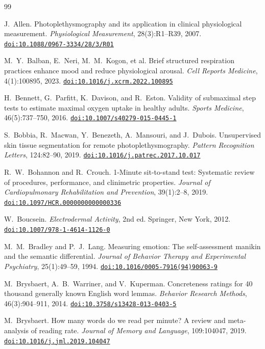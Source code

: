 \documentclass[11pt,a4paper]{article}
\newcommand{\doi}[1]{\href{https://doi.org/#1}{\nolinkurl{doi:#1}}}
\begin{document}
\begin{thebibliography}{99}
\small

 J.~Allen. Photoplethysmography and its application in clinical physiological measurement.
\emph{Physiological Measurement}, 28(3):R1--R39, 2007. \doi{10.1088/0967-3334/28/3/R01}

 M.~Y.~Balban, E.~Neri, M.~M.~Kogon, et al. Brief structured respiration practices enhance mood
and reduce physiological arousal. \emph{Cell Reports Medicine}, 4(1):100895, 2023. \doi{10.1016/j.xcrm.2022.100895}

 H.~Bennett, G.~Parfitt, K.~Davison, and R.~Eston. Validity of submaximal step tests to
estimate maximal oxygen uptake in healthy adults. \emph{Sports Medicine}, 46(5):737--750, 2016.
\doi{10.1007/s40279-015-0445-1}

 S.~Bobbia, R.~Macwan, Y.~Benezeth, A.~Mansouri, and J.~Dubois. Unsupervised skin tissue
segmentation for remote photoplethysmography. \emph{Pattern Recognition Letters}, 124:82--90, 2019.
\doi{10.1016/j.patrec.2017.10.017}

 R.~W.~Bohannon and R.~Crouch. 1-Minute sit-to-stand test: Systematic review of procedures,
performance, and clinimetric properties. \emph{Journal of Cardiopulmonary Rehabilitation and Prevention},
39(1):2--8, 2019. \doi{10.1097/HCR.0000000000000336}

 W.~Boucsein. \emph{Electrodermal Activity}, 2nd ed. Springer, New York, 2012.
\doi{10.1007/978-1-4614-1126-0}

 M.~M.~Bradley and P.~J.~Lang. Measuring emotion: The self-assessment manikin and the semantic
differential. \emph{Journal of Behavior Therapy and Experimental Psychiatry}, 25(1):49--59, 1994.
\doi{10.1016/0005-7916(94)90063-9}

 M.~Brysbaert, A.~B.~Warriner, and V.~Kuperman. Concreteness ratings for 40 thousand generally
known English word lemmas. \emph{Behavior Research Methods}, 46(3):904--911, 2014. \doi{10.3758/s13428-013-0403-5}

 M.~Brysbaert. How many words do we read per minute? A review and meta-analysis of reading
rate. \emph{Journal of Memory and Language}, 109:104047, 2019. \doi{10.1016/j.jml.2019.104047}


\end{thebibliography}
\end{document}
